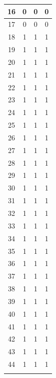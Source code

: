 \begin{longtable}[c]{|c|c|c|c|}
16 & 0 & 0 & 0 \\ \hline
\rowcolor[HTML]{81DAF5} 
17 & 0 & 0 & 0 \\ \hline
\rowcolor[HTML]{81DAF5} 
18 & 1 & 1 & 1 \\ \hline
\rowcolor[HTML]{81DAF5} 
19 & 1 & 1 & 1 \\ \hline
\rowcolor[HTML]{81DAF5} 
20 & 1 & 1 & 1 \\ \hline
\rowcolor[HTML]{81DAF5} 
21 & 1 & 1 & 1 \\ \hline
\rowcolor[HTML]{81DAF5} 
22 & 1 & 1 & 1 \\ \hline
\rowcolor[HTML]{81DAF5} 
23 & 1 & 1 & 1 \\ \hline
\rowcolor[HTML]{81DAF5} 
24 & 1 & 1 & 1 \\ \hline
\rowcolor[HTML]{81DAF5} 
25 & 1 & 1 & 1 \\ \hline
\rowcolor[HTML]{81DAF5} 
26 & 1 & 1 & 1 \\ \hline
\rowcolor[HTML]{81DAF5} 
27 & 1 & 1 & 1 \\ \hline
\rowcolor[HTML]{81DAF5} 
28 & 1 & 1 & 1 \\ \hline
\rowcolor[HTML]{81DAF5} 
29 & 1 & 1 & 1 \\ \hline
\rowcolor[HTML]{81DAF5} 
30 & 1 & 1 & 1 \\ \hline
\rowcolor[HTML]{81DAF5} 
31 & 1 & 1 & 1 \\ \hline
\rowcolor[HTML]{81DAF5} 
32 & 1 & 1 & 1 \\ \hline
\rowcolor[HTML]{81DAF5} 
33 & 1 & 1 & 1 \\ \hline
\rowcolor[HTML]{81DAF5} 
34 & 1 & 1 & 1 \\ \hline
\rowcolor[HTML]{81DAF5} 
35 & 1 & 1 & 1 \\ \hline
\rowcolor[HTML]{81DAF5} 
36 & 1 & 1 & 1 \\ \hline
\rowcolor[HTML]{81DAF5} 
37 & 1 & 1 & 1 \\ \hline
\rowcolor[HTML]{81DAF5} 
38 & 1 & 1 & 1 \\ \hline
\rowcolor[HTML]{81DAF5} 
39 & 1 & 1 & 1 \\ \hline
\rowcolor[HTML]{81DAF5} 
40 & 1 & 1 & 1 \\ \hline
\rowcolor[HTML]{81DAF5} 
41 & 1 & 1 & 1 \\ \hline
\rowcolor[HTML]{81DAF5} 
42 & 1 & 1 & 1 \\ \hline
\rowcolor[HTML]{81DAF5} 
43 & 1 & 1 & 1 \\ \hline
\rowcolor[HTML]{81DAF5} 
44 & 1 & 1 & 1 \\ \hline
\rowcolor[HTML]{81DAF5} 

\end{longtable}
